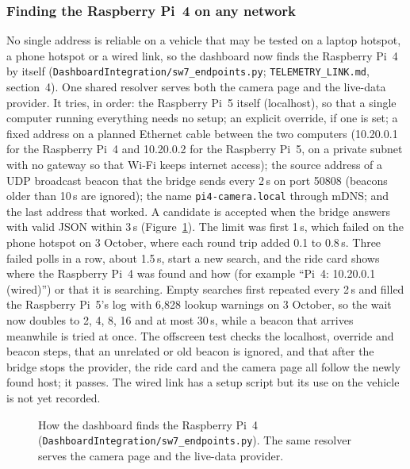 \subsubsection*{Finding the Raspberry Pi~4 on any network}
\label{sec:pi4-discovery}
No single address is reliable on a vehicle that may be tested on a laptop hotspot, a phone hotspot or a wired link, so the dashboard now finds the Raspberry Pi~4 by itself (\texttt{DashboardIntegration/sw7\_endpoints.py}; \texttt{TELEMETRY\_LINK.md}, section~4). One shared resolver serves both the camera page and the live-data provider. It tries, in order: the Raspberry Pi~5 itself (localhost), so that a single computer running everything needs no setup; an explicit override, if one is set; a fixed address on a planned Ethernet cable between the two computers (10.20.0.1 for the Raspberry Pi~4 and 10.20.0.2 for the Raspberry Pi~5, on a private subnet with no gateway so that Wi-Fi keeps internet access); the source address of a UDP broadcast beacon that the bridge sends every 2\,s on port 50808 (beacons older than 10\,s are ignored); the name \texttt{pi4-camera.local} through mDNS; and the last address that worked. A candidate is accepted when the bridge answers with valid JSON within 3\,s (Figure~\ref{fig:pi4-discovery}). The limit was first 1\,s, which failed on the phone hotspot on 3 October, where each round trip added 0.1 to 0.8\,s. Three failed polls in a row, about 1.5\,s, start a new search, and the ride card shows where the Raspberry Pi~4 was found and how (for example ``Pi~4: 10.20.0.1 (wired)'') or that it is searching. Empty searches first repeated every 2\,s and filled the Raspberry Pi~5's log with 6,828 lookup warnings on 3 October, so the wait now doubles to 2, 4, 8, 16 and at most 30\,s, while a beacon that arrives meanwhile is tried at once. The offscreen test checks the localhost, override and beacon steps, that an unrelated or old beacon is ignored, and that after the bridge stops the provider, the ride card and the camera page all follow the newly found host; it passes. The wired link has a setup script but its use on the vehicle is not yet recorded.

\begin{figure}[htbp]
\centering

\caption{How the dashboard finds the Raspberry Pi~4 (\texttt{DashboardIntegration/sw7\_endpoints.py}). The same resolver serves the camera page and the live-data provider.}
\label{fig:pi4-discovery}
\end{figure}

